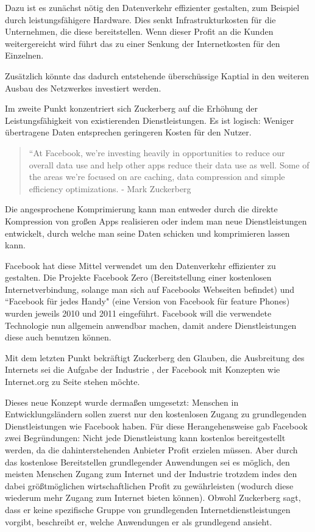 \documentclass{article}
\begin{document}
Dazu ist es zunächst nötig den Datenverkehr effizienter gestalten, zum Beispiel durch leistungsfähigere Hardware.
Dies senkt Infrastrukturkosten für die Unternehmen, die diese bereitstellen.
Wenn dieser Profit an die Kunden weitergereicht wird führt das zu einer Senkung der Internetkosten für den Einzelnen.

Zusätzlich könnte das dadurch entstehende überschüssige Kaptial in den weiteren Ausbau des Netzwerkes investiert werden.

\medskip

Im zweite Punkt konzentriert sich Zuckerberg auf die Erhöhung der Leistungsfähigkeit von existierenden Dienstleistungen.
Es ist logisch: Weniger übertragene Daten entsprechen geringeren Kosten für den Nutzer.

\begin{quote}
``At Facebook, we’re investing heavily in opportunities to reduce our overall data use and help  other apps     
reduce their data use as well. Some of the areas we’re focused on are caching, data compression and simple efficiency optimizations.
- Mark Zuckerberg \textcite[8]{HumanRight}
\end{quote}

Die angesprochene Komprimierung kann man entweder durch die direkte Kompression von großen Apps realisieren oder indem man neue Dienstleistungen entwickelt, durch welche man seine Daten schicken und komprimieren lassen kann.

Facebook hat diese Mittel verwendet um den Datenverkehr effizienter zu gestalten.
Die Projekte Facebook Zero (Bereitstellung einer kostenlosen Internetverbindung, solange man sich auf Facebooks Webseiten befindet) und ``Facebook für jedes Handy" (eine Version von Facebook für feature Phones) wurden jeweils  2010 und 2011 eingeführt.
Facebook will die verwendete Technologie nun allgemein anwendbar machen, damit andere Dienstleistungen diese auch benutzen können.

\medskip

Mit dem letzten Punkt bekräftigt Zuckerberg den Glauben, die Ausbreitung des Internets sei die Aufgabe der Industrie , der Facebook mit Konzepten wie Internet.org zu Seite stehen möchte.

Dieses neue Konzept wurde dermaßen umgesetzt: Menschen in Entwicklungsländern sollen zuerst nur den kostenlosen Zugang zu grundlegenden Dienstleistungen wie Facebook haben.
Für diese Herangehensweise gab Facebook zwei Begründungen:
\medskip
Nicht jede Dienstleistung kann kostenlos bereitgestellt werden, da die dahinterstehenden Anbieter Profit erzielen müssen. 
Aber durch das kostenlose Bereitstellen grundlegender Anwendungen sei es möglich, den meisten Menschen Zugang zum Internet und der Industrie trotzdem indes den dabei größtmöglichen wirtschaftlichen Profit zu gewährleisten (wodurch diese wiederum mehr Zugang zum Internet bieten können).
Obwohl Zuckerberg sagt, dass er keine spezifische Gruppe von grundlegenden Internetdienstleistungen vorgibt, beschreibt er, welche Anwendungen er als grundlegend ansieht.
\end{document}
